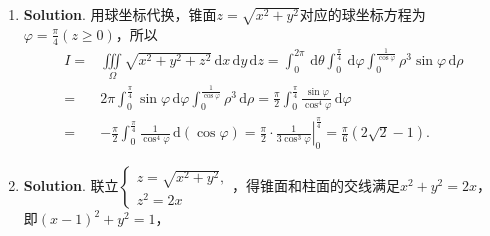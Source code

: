 \documentclass[../Main.tex]{subfiles}
\begin{document}
\begin{enumerate}
          则$\begin{cases}
                  x = 3u(1-v), \\
                  y = 4uv
              \end{cases}$，$|J| = \left|
              \begin{vmatrix}
                  3(1-v) & -3u \\
                  4v     & 4u
              \end{vmatrix}\right| = 12u$. 故
          \[
              \begin{aligned}
                  I = & \iint\limits_{D}x^{2} y\,\mathrm{d}x\,\mathrm{d}y = \int_{0}^{1}\,\mathrm{d}u\int_{0}^{1}\left[3u(1-v)\right]^{2} \cdot 4uv \cdot 12u\,\mathrm{d}v \\
                  =   & 432\int_{0}^{1}u^{4}\,\mathrm{d}u\int_{0}^{1}v(1-v)^{2}\,\mathrm{d}v = 432\cdot\frac{1}{5}\cdot\frac{2!}{4!}= \frac{36}{5}.
              \end{aligned}
          \]

    \item \textbf{Solution}. 用球坐标代换，锥面$z=\sqrt{x^{2}+y^{2}}$对应的球坐标方程为$\varphi
              = \frac{\pi}{4}(z\geq 0)$，所以
          \[
              \begin{aligned}
                  I = & \iiint\limits_{\Omega}\sqrt{x^2+y^2+z^2}\,\mathrm{d}x\,\mathrm{d}y\,\mathrm{d}z = \int_{0}^{2\pi}\,\mathrm{d}\theta\int_{0}^{\frac{\pi}{4}}\,\mathrm{d}\varphi\int_{0}^{\frac{1}{\cos \varphi}}\rho^{3}\sin \varphi\,\mathrm{d}\rho \\
                  =   & 2\pi\int_{0}^{\frac{\pi}{4}}\sin \varphi\,\mathrm{d}\varphi\int_{0}^{\frac{1}{\cos \varphi}}\rho^{3}\,\mathrm{d}\rho = \frac{\pi}{2}\int_{0}^{\frac{\pi}{4}}\frac{\sin \varphi}{\cos^{4} \varphi}\,\mathrm{d}\varphi                \\
                  =   & -\frac{\pi}{2}\int_{0}^{\frac{\pi}{4}}\frac{1}{\cos^4 \varphi}\,\mathrm{d}(\cos \varphi) = \left.\frac{\pi}{2}\cdot \frac{1}{3\cos^{3} \varphi}\right|_{0}^{\frac{\pi}{4}}= \frac{\pi}{6}\left(2\sqrt{2}-1\right).
              \end{aligned}
          \]

    \item \textbf{Solution}. 联立$\begin{cases}
                  z=\sqrt{x^2+y^2}, \\
                  z^{2}=2x
              \end{cases}$，得锥面和柱面的交线满足$x^{2}+y^{2}=2x$，即$(x-1)^{2}+y^{2}=1$，


\end{enumerate}
\end{document}
